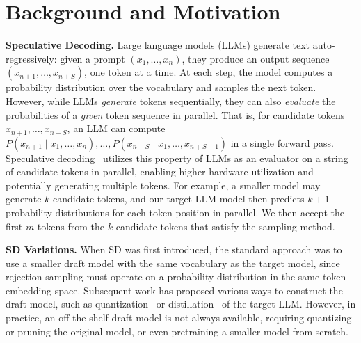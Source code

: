 \documentclass{article}
\begin{document}
\section{Background and Motivation}
\textbf{Speculative Decoding.}
Large language models (LLMs) generate text auto-regressively: given a prompt $(x_1, \ldots, x_n)$, they produce an output sequence $(x_{n+1}, \ldots, x_{n+S})$, 
one token at a time. At each step, the model computes a probability distribution over the vocabulary and samples the next token. 
However, while LLMs \emph{generate} tokens sequentially, they can also \emph{evaluate} the probabilities of a \emph{given} token sequence in parallel. That is, for candidate tokens $x_{n+1}, \ldots, x_{n+S}$, an LLM can compute $P(x_{n+1} \mid x_1, \ldots, x_n), \ldots, P(x_{n+S} \mid x_1, \ldots, x_{n+S-1})$ in a single forward pass.
Speculative decoding~\cite{leviathan2023fast, chen2023accelerating} utilizes this property of LLMs as an evaluator on a string of candidate tokens in parallel, enabling higher hardware utilization and potentially generating multiple tokens.
For example, a smaller model may generate $k$ candidate tokens, and our target LLM model then predicts $k+1$ probability distributions for each token position in parallel. We then accept the first $m$ tokens from the $k$ candidate tokens that satisfy the sampling method. 

\textbf{SD Variations.}
When SD was first introduced, the standard approach was to use a smaller draft model with the same vocabulary as the target model, since rejection sampling must operate on a probability distribution in the same token embedding space.
Subsequent work has proposed various ways to construct the draft model, such as quantization~\cite{lin2023awq, frantar2023gptq, kim2024squeezellm} or distillation~\cite{zhou2023distillspec} of the target LLM.
However, in practice, an off-the-shelf draft model is not always available, requiring quantizing or pruning the original model, or even pretraining a smaller model from scratch.
\end{document}
